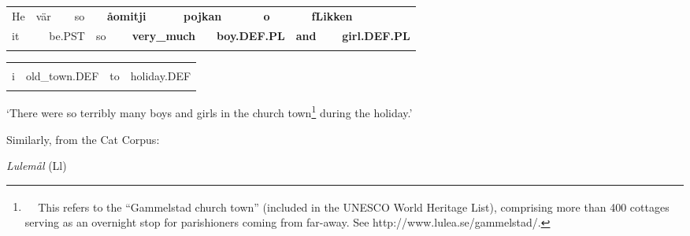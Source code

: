 \begin{tabular}{llllllllllllll}
\lsptoprule
He & \multicolumn{2}{l}{vär

} & \multicolumn{2}{l}{so

} & \multicolumn{2}{l}{{\bfseries åomitji}

} & \multicolumn{2}{l}{{\bfseries pojkan}

} & \multicolumn{2}{l}{{\bfseries o}

} & \multicolumn{2}{l}{{\bfseries fLikken}

} & \\
\multicolumn{2}{l}{it

} & \multicolumn{2}{l}{be.PST

} & \multicolumn{2}{l}{so

} & \multicolumn{2}{l}{{\bfseries very\_much}

} & \multicolumn{2}{l}{{\bfseries boy.DEF.PL}

} & \multicolumn{2}{l}{{\bfseries and}

} & \multicolumn{2}{l}{{\bfseries girl.DEF.PL}

}\\
\lspbottomrule
\end{tabular}

\begin{tabular}{llll}
\lsptoprule
\multicolumn{4}{l}{ini

}\\
i & old\_town.DEF & to & holiday.DEF\\
\lspbottomrule
\end{tabular}

\begin{styleTranslation}
‘There were so terribly many boys and girls in the church town\footnote{\textsuperscript{\ \ } This refers to the “Gammelstad church town” (included in the UNESCO World Heritage List), comprising more than 400 cottages serving as an overnight stop for parishioners coming from far-away. See http://www.lulea.se/gammelstad/.} during the holiday.’

\end{styleTranslation}

\begin{styleBodyTextFirst}
Similarly, from the Cat Corpus:

\end{styleBodyTextFirst}

\begin{listWWNumileveli}
\item {}

\begin{styleExample}
\textit{Lulemål }(Ll) 

\end{styleExample}

\end{listWWNumileveli}

